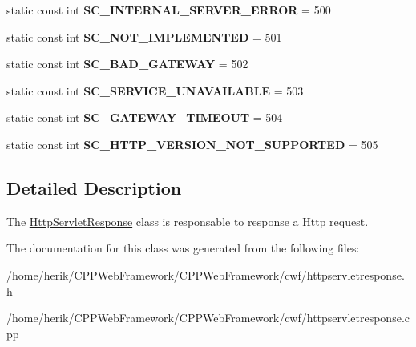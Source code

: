 \begin{DoxyCompactItemize}
static const int {\bfseries S\+C\+\_\+\+I\+N\+T\+E\+R\+N\+A\+L\+\_\+\+S\+E\+R\+V\+E\+R\+\_\+\+E\+R\+R\+OR} = 500
\item 
\mbox{\label{class_http_servlet_response_a29bbe265aa6c97ddde0110e707e5e027}} 
static const int {\bfseries S\+C\+\_\+\+N\+O\+T\+\_\+\+I\+M\+P\+L\+E\+M\+E\+N\+T\+ED} = 501
\item 
\mbox{\label{class_http_servlet_response_a0f3a889cde6396de96e648aa4c49b84e}} 
static const int {\bfseries S\+C\+\_\+\+B\+A\+D\+\_\+\+G\+A\+T\+E\+W\+AY} = 502
\item 
\mbox{\label{class_http_servlet_response_aded2fd25e5c594b345740b3f11caa8a9}} 
static const int {\bfseries S\+C\+\_\+\+S\+E\+R\+V\+I\+C\+E\+\_\+\+U\+N\+A\+V\+A\+I\+L\+A\+B\+LE} = 503
\item 
\mbox{\label{class_http_servlet_response_afe4365a66d7eac9fa8db90089bb76b6b}} 
static const int {\bfseries S\+C\+\_\+\+G\+A\+T\+E\+W\+A\+Y\+\_\+\+T\+I\+M\+E\+O\+UT} = 504
\item 
\mbox{\label{class_http_servlet_response_ad63dea43b964dbd3ad326f976f001048}} 
static const int {\bfseries S\+C\+\_\+\+H\+T\+T\+P\+\_\+\+V\+E\+R\+S\+I\+O\+N\+\_\+\+N\+O\+T\+\_\+\+S\+U\+P\+P\+O\+R\+T\+ED} = 505
\end{DoxyCompactItemize}


\subsection{Detailed Description}
The \hyperlink{class_http_servlet_response}{Http\+Servlet\+Response} class is responsable to response a Http request. 

The documentation for this class was generated from the following files\+:\begin{DoxyCompactItemize}
\item 
/home/herik/\+C\+P\+P\+Web\+Framework/\+C\+P\+P\+Web\+Framework/cwf/httpservletresponse.\+h\item 
/home/herik/\+C\+P\+P\+Web\+Framework/\+C\+P\+P\+Web\+Framework/cwf/httpservletresponse.\+cpp\end{DoxyCompactItemize}
